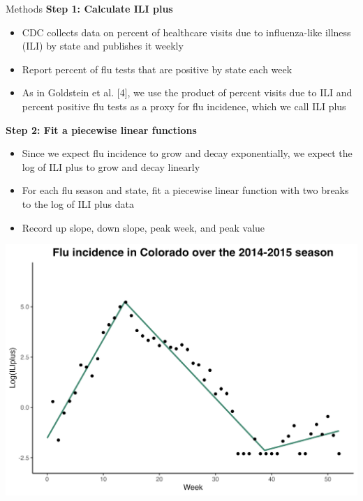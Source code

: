 \vspace{\colonesep}

\begin{block}{Methods}
\textbf{Step 1: Calculate ILI plus}
\begin{itemize}
	\item CDC collects data on percent of healthcare visits due to influenza-like illness (ILI) by state and publishes it weekly
	\item Report percent of flu tests that are positive by state each week
	\item As in Goldstein et al. [4], we use the product of percent visits due to ILI and percent positive flu tests as a proxy for flu incidence, which we call ILI plus
\end{itemize}

\textbf{Step 2: Fit a piecewise linear functions}
\begin{itemize}
	\item Since we expect flu incidence to grow and decay exponentially, we expect the log of ILI plus to grow and decay linearly
	\item For each flu season and state, fit a piecewise linear function with two breaks to the log of ILI plus data
	\item Record up slope, down slope, peak week, and peak value
\end{itemize}
\begin{center}
	\includegraphics[width = 0.59\columnwidth]{sections/images/Colorado2014(just-fit).png}
\end{center}
\end{block}
